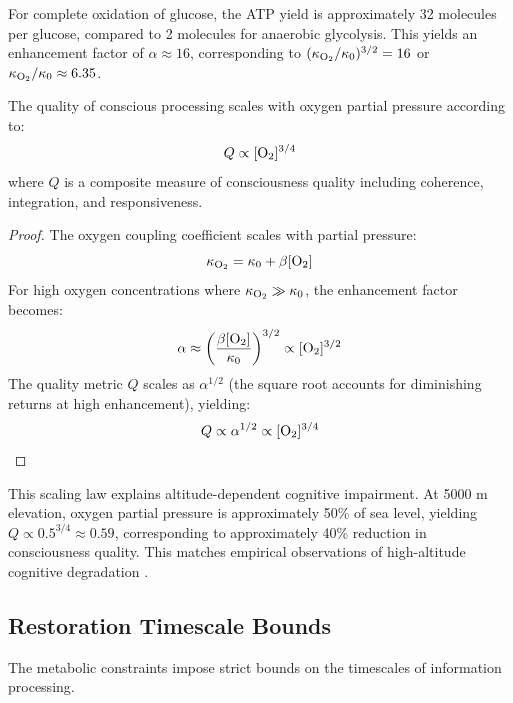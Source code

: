 For complete oxidation of glucose, the ATP yield is approximately 32 molecules per glucose, compared to 2 molecules for anaerobic glycolysis. This yields an enhancement factor of $\alpha \approx 16$, corresponding to $(\kappa_{\ce{O2}}/\kappa_0)^{3/2} = 16$ or $\kappa_{\ce{O2}}/\kappa_0 \approx 6.35$.

\begin{theorem}
\label{thm:oxygen_pressure}
The quality of conscious processing scales with oxygen partial pressure according to:
\begin{equation}
Q \propto [\ce{O2}]^{3/4}
\label{eq:oxygen_scaling}
\end{equation}
where $Q$ is a composite measure of consciousness quality including coherence, integration, and responsiveness.

\end{theorem}

\begin{proof}
The oxygen coupling coefficient scales with partial pressure:
\begin{equation}
\kappa_{\ce{O2}} = \kappa_0 + \beta [\ce{O2}]
\end{equation}
For high oxygen concentrations where $\kappa_{\ce{O2}} \gg \kappa_0$, the enhancement factor becomes:
\begin{equation}
\alpha \approx \left(\frac{\beta [\ce{O2}]}{\kappa_0}\right)^{3/2} \propto [\ce{O2}]^{3/2}
\end{equation}
The quality metric $Q$ scales as $\alpha^{1/2}$ (the square root accounts for diminishing returns at high enhancement), yielding:
\begin{equation}
Q \propto \alpha^{1/2} \propto [\ce{O2}]^{3/4}
\end{equation}
\end{proof}

This scaling law explains altitude-dependent cognitive impairment. At 5000 m elevation, oxygen partial pressure is approximately 50\% of sea level, yielding $Q \propto 0.5^{3/4} \approx 0.59$, corresponding to approximately 40\% reduction in consciousness quality. This matches empirical observations of high-altitude cognitive degradation \citep{wilson2009cerebral,virues2016hypoxia}.

\subsection{Restoration Timescale Bounds}

The metabolic constraints impose strict bounds on the timescales of information processing.

